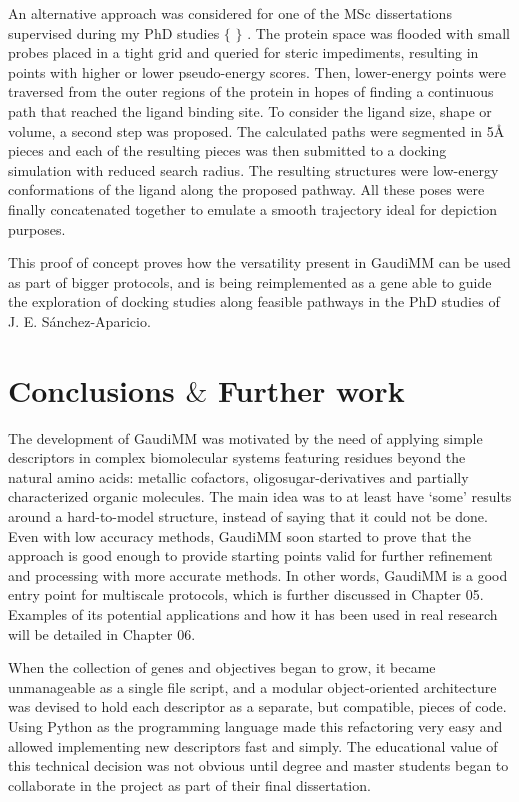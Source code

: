 An alternative approach was considered for one of the MSc dissertations supervised during my PhD studies $ \{ $ $ \} $ . The protein space was flooded with small probes placed in a tight grid and queried for steric impediments, resulting in points with higher or lower pseudo-energy scores. Then, lower-energy points were traversed from the outer regions of the protein in hopes of finding a continuous path that reached the ligand binding site. To consider the ligand size, shape or volume, a second step was proposed. The calculated paths were segmented in 5Å pieces and each of the resulting pieces was then submitted to a docking simulation with reduced search radius. The resulting structures were low-energy conformations of the ligand along the proposed pathway. All these poses were finally concatenated together to emulate a smooth trajectory ideal for depiction purposes.

This proof of concept proves how the versatility present in GaudiMM can be used as part of bigger protocols, and is being reimplemented as a gene able to guide the exploration of docking studies along feasible pathways in the PhD studies of J. E. Sánchez-Aparicio.

\section{Conclusions $\&$  Further work}
The development of GaudiMM was motivated by the need of applying simple descriptors in complex biomolecular systems featuring residues beyond the natural amino acids: metallic cofactors, oligosugar-derivatives and partially characterized organic molecules. The main idea was to at least have ‘some’ results around a hard-to-model structure, instead of saying that it could not be done. Even with low accuracy methods, GaudiMM soon started to prove that the approach is good enough to provide starting points valid for further refinement and processing with more accurate methods. In other words, GaudiMM is a good entry point for multiscale protocols, which is further discussed in Chapter 05. Examples of its potential applications and how it has been used in real research will be detailed in Chapter 06.

When the collection of genes and objectives began to grow, it became unmanageable as a single file script, and a modular object-oriented architecture was devised to hold each descriptor as a separate, but compatible, pieces of code. Using Python as the programming language made this refactoring very easy and allowed implementing new descriptors fast and simply. The educational value of this technical decision was not obvious until degree and master students began to collaborate in the project as part of their final dissertation.

